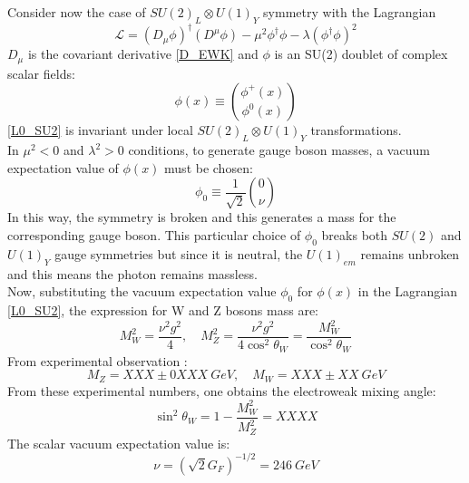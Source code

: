 Consider now the case of  $SU(2)_{L} \otimes U(1)_{Y}$ symmetry \cite{SU2_Hmechanism} with the Lagrangian
\begin{equation}
\mathcal{L} = (D_{\mu}\phi)^{\dagger}(D^{\mu}\phi)-\mu^{2}\phi^{\dagger}\phi-\lambda(\phi^{\dagger}\phi)^{2}
\label{L0_SU2}
\end{equation}
$D_{\mu}$ is the covariant derivative \ref{D_EWK} and $\phi$ is an SU(2) doublet of complex scalar fields:
\begin{equation}
\phi(x) \equiv {\phi^{+}(x) \choose \phi^0(x)}
\label{phi_SU2}
\end{equation}
\ref{L0_SU2} is invariant under local $SU(2)_{L} \otimes U(1)_{Y}$ transformations. \\
In $\mu^{2} < 0$ and $\lambda^{2} > 0$ conditions, to generate gauge boson masses, a vacuum expectation value of $\phi(x)$ must be chosen:
\begin{equation}
\phi_{0} \equiv \frac{1}{\sqrt{2}}{0 \choose \nu}
\label{SU2_U1_V0}
\end{equation}
In this way, the symmetry is broken and this generates a mass for the corresponding gauge boson. This particular choice of $\phi_{0}$ breaks both $SU(2)$ and $U(1)_{Y}$ gauge symmetries but since it is neutral, the $U(1)_{em}$ remains unbroken and this means the photon remains massless. \\
Now, substituting the vacuum expectation value $\phi_{0}$ for $\phi(x)$ in the Lagrangian \ref{L0_SU2}, the expression for W and Z bosons mass are:
\begin{equation}
M_{W}^{2} = \frac{\nu^{2}g^{2}}{4}, \quad M_{Z}^{2} = \frac{\nu^{2}g^{2}}{4\cos^{2}\theta_{W}}=\frac{M_{W}^{2}}{\cos^{2}{\theta_{W}}}
\label{WZ_mass_expression}
\end{equation}
From experimental observation \cite{PDG}:
\begin{equation}
M_{Z} = XXX\pm0XXX\ GeV, \quad M_{W} = XXX\pm XX\ GeV
\end{equation}
From these experimental numbers, one obtains the electroweak mixing angle:
\begin{equation}
\sin^{2}\theta_{W} = 1-\frac{M^{2}_{W}}{M^{2}_{Z}} = XXXX
\end{equation}
The scalar vacuum expectation value is:
\begin{equation}
\nu=(\sqrt{2}G_{F})^{-1/2}=246\ GeV
\end{equation}
